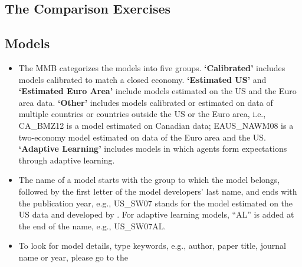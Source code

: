 \documentclass[10pt,a4paper]{article}
\begin{document}
	
	\begin{flushleft}
		\section{The Comparison Exercises}
	\end{flushleft}
	\medskip
	
	\subsection{Models}
	\label{sec:Models}
	\medskip
	
	\begin{itemize}
		\item The MMB categorizes the models into five groups. \textbf{‘Calibrated’} includes models calibrated to match a closed economy. \textbf{‘Estimated US’} and \textbf{‘Estimated Euro Area’} include models estimated on the US and the Euro area data. \textbf{‘Other’} includes models calibrated or estimated on data of multiple countries or countries outside the US or the Euro area, i.e., CA\_BMZ12 is a model estimated on Canadian data; EAUS\_NAWM08 is a two-economy model estimated on data of the Euro area and the US. \textbf{‘Adaptive Learning’} includes models in which agents form expectations through adaptive learning.
		
		\item The name of a model starts with the group to which the model belongs, followed by the first letter of the model developers’ last name, and ends with the publication year, e.g., US\_SW07 stands for the model estimated on the US data and developed by \cite{SmetsWouters2007}. For adaptive learning models, “AL” is added at the end of the name, e.g., US\_SW07AL.
		
		\item To look for model details, type keywords, e.g., author, paper title, journal name or year, please go to the 
		
		
	\end{itemize}
	
	
	
\end{document}
